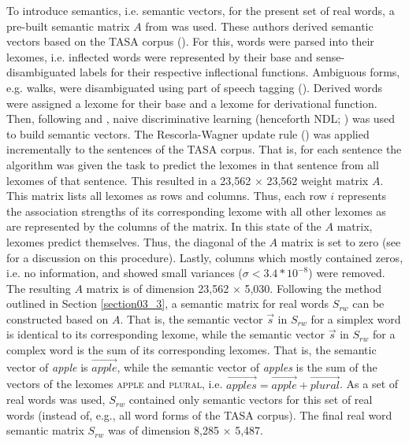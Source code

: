 To introduce semantics, i.e. semantic vectors, for the present set of real words, a pre-built semantic matrix $A$ from \citet{Baayen2019} was used. These authors derived semantic vectors based on the TASA corpus (\cite{Ivens1991}). For this, words were parsed into their lexomes, i.e. inflected words were represented by their base and sense-disambiguated labels for their respective inflectional functions. Ambiguous forms, e.g. walks, were disambiguated using part of speech tagging (\cite{Schmid1999}). Derived words were assigned a lexome for their base and a lexome for derivational function. Then, following \citet{Baayen2016} and \citet{Milin2017Feldman}, naive discriminative learning (henceforth NDL; \cite{Baayen2011, Sering2018}) was used to build semantic vectors. The Rescorla-Wagner update rule (\cite{Rescorla1972, Wagner1972, Rescorla1988}) was applied incrementally to the sentences of the TASA corpus. That is, for each sentence the algorithm was given the task to predict the lexomes in that sentence from all lexomes of that sentence. This resulted in a 23,562 × 23,562 weight matrix $A$. This matrix lists all lexomes as rows and columns. Thus, each row $i$ represents the association strengths of its corresponding lexome with all other lexomes as are represented by the columns of the matrix. In this state of the $A$ matrix, lexomes predict themselves. Thus, the diagonal of the $A$ matrix is set to zero (see \cite{Baayen2019} for a discussion on this procedure). Lastly, columns which mostly contained zeros, i.e. no information, and showed small variances ($σ<3.4*10^{-8}$) were removed. The resulting $A$ matrix is of dimension 23,562 × 5,030. Following the method outlined in Section \ref{section03_3}, a semantic matrix for real words $S_{rw}$ can be constructed based on $A$. That is, the semantic vector $\overrightarrow{s}$ in $S_{rw}$ for a simplex word is identical to its corresponding lexome, while the semantic vector $\overrightarrow{s}$ in $S_{rw}$ for a complex word is the sum of its corresponding lexomes. That is, the semantic vector of \textit{apple} is $\overrightarrow{apple}$, while the semantic vector of \textit{apples} is the sum of the vectors of the lexomes \textsc{apple} and \textsc{plural}, i.e. $\overrightarrow{apples}=\overrightarrow{apple}+\overrightarrow{plural}$. As a set of real words was used, $S_{rw}$ contained only semantic vectors for this set of real words (instead of, e.g., all word forms of the TASA corpus). The final real word semantic matrix $S_{rw}$ was of dimension 8,285 × 5,487.

